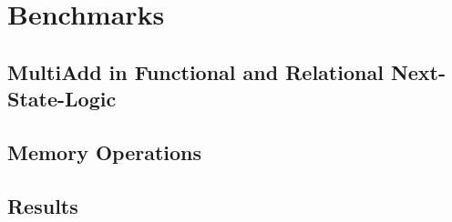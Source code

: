 \chapter{Benchmarks}\label{chap:benchmarks}
\section{MultiAdd in Functional and Relational Next-State-Logic}
\section{Memory Operations}
\section{Results}